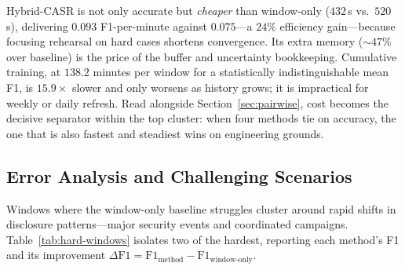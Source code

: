 \documentclass[a4paper,twoside]{article}
\begin{document}
Hybrid-CASR is not only accurate but \emph{cheaper} than window-only ($432$\,s vs.\ $520$\,s), delivering $0.093$ F1-per-minute against $0.075$---a $24\%$ efficiency gain---because focusing rehearsal on hard cases shortens convergence. Its extra memory ($\sim$$47\%$ over baseline) is the price of the buffer and uncertainty bookkeeping. Cumulative training, at $138.2$ minutes per window for a statistically indistinguishable mean F1, is $15.9\times$ slower and only worsens as history grows; it is impractical for weekly or daily refresh. Read alongside Section~\ref{sec:pairwise}, cost becomes the decisive separator within the top cluster: when four methods tie on accuracy, the one that is also fastest and steadiest wins on engineering grounds.

\subsection{Error Analysis and Challenging Scenarios}
\label{sec:error-analysis}

\noindent
Windows where the window-only baseline struggles cluster around rapid shifts in disclosure patterns---major security events and coordinated campaigns. Table~\ref{tab:hard-windows} isolates two of the hardest, reporting each method's F1 and its improvement $\Delta\mathrm{F1}=\mathrm{F1}_{\text{method}}-\mathrm{F1}_{\text{window-only}}$.

\begin{table}[t]
  \caption{Method performance on challenging windows. Reproduced from the conference version~\citep{Dou2026ICISSP}.}
  \label{tab:hard-windows}
  \centering
\end{table}
\end{document}
